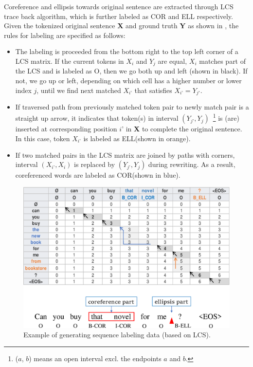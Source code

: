 Coreference and ellipsis towards original sentence are extracted through LCS trace back algorithm, which is further labeled as COR and ELL respectively. Given the tokenized original sentence \textbf{X} and ground truth \textbf{Y} as shown in , the rules for labeling are specified as follows:
\begin{itemize}
\item {
The labeling is proceeded from the bottom right to the top left corner of a LCS matrix. If the current tokens in $X_i$ and $Y_j$ are equal, $X_i$ matches part of the LCS and is labeled as O, then we go both up and left (shown in black). If not, we go up or left, depending on which cell has a higher number or lower index $j$, until we find next matched $X_{i’}$ that satisfies $X_{i’}=Y_{j'}$.} 
\item {If traversed path from previously matched token pair to newly match pair is a straight up arrow, it indicates that token(s) in interval
$(Y_{j’},Y_j)$~\footnote{($a$, $b$) means an open interval excl. the endpoints $a$ and $b$.}
is (are) inserted at corresponding position $i’$ in \textbf{X} to complete 
the original sentence. In this case, token $X_{i’}$ is labeled as ELL(shown in orange).}
\item {If two matched pairs in the LCS matrix are joined by paths with corners, interval $(X_{i’},X_i)$ is replaced by $(Y_{j’},Y_j)$ during rewriting. As a result, coreferenced words are labeled as COR(shown in blue).}
\end{itemize}

\begin{figure}[th]
        \centering
        \includegraphics[width=1.0\columnwidth]{lcs-table.eps}
        \caption{Example of generating sequence labeling data (based on LCS).}
        \label{fig:lcs}
\end{figure}

